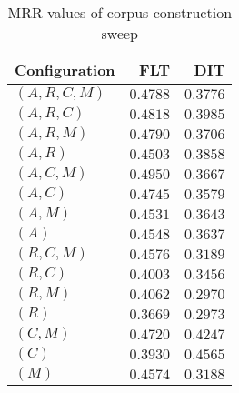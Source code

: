 
\begin{table}
\begin{spacing}{1.2}
\centering
\caption{MRR values of \zookeeper corpus construction sweep}
\label{table:zookeeper_corpus_sweep}
\vspace{0.2em}
\begin{tabular}{lrr}
\toprule
Configuration &           FLT &           DIT \\
\midrule
  $(A,R,C,M)$ &      $0.4788$ &      $0.3776$ \\
    $(A,R,C)$ &      $0.4818$ &      $0.3985$ \\
    $(A,R,M)$ &      $0.4790$ &      $0.3706$ \\
      $(A,R)$ &      $0.4503$ &      $0.3858$ \\
    $(A,C,M)$ & $\bm{0.4950}$ &      $0.3667$ \\
      $(A,C)$ &      $0.4745$ &      $0.3579$ \\
      $(A,M)$ &      $0.4531$ &      $0.3643$ \\
        $(A)$ &      $0.4548$ &      $0.3637$ \\
    $(R,C,M)$ &      $0.4576$ &      $0.3189$ \\
      $(R,C)$ &      $0.4003$ &      $0.3456$ \\
      $(R,M)$ &      $0.4062$ &      $0.2970$ \\
        $(R)$ &      $0.3669$ &      $0.2973$ \\
      $(C,M)$ &      $0.4720$ &      $0.4247$ \\
        $(C)$ &      $0.3930$ & $\bm{0.4565}$ \\
        $(M)$ &      $0.4574$ &      $0.3188$ \\
\bottomrule
\end{tabular}

\end{spacing}
\end{table}
